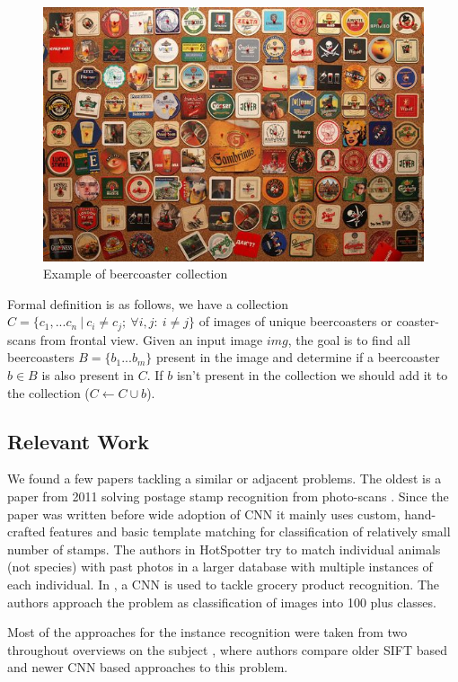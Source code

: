 \documentclass{article}
\begin{document}
\begin{figure}[H]
    \center
    \includegraphics[scale=0.5]{img/coasters.jpg}
    \caption{Example of beercoaster collection \cite{coasterExample}}
\end{figure}

Formal definition is as follows, we have a collection $C=\{c_1,...c_n\ |\ c_i \neq c_j;\ \forall i,j:\ i \neq j\}$ of images of unique beercoasters or coaster-scans from frontal view.
Given an input image $img$, the goal is to find all beercoasters $B=\{b_1...b_m\}$ present in the image 
and determine if a beercoaster $b \in B$ is also present in $C$. 
If $b$ isn't present in the collection we should add it to the collection ($C \leftarrow C \cup b$).

\subsection{Relevant Work}
We found a few papers tackling a similar or adjacent problems.
The oldest is a paper from 2011 solving postage stamp recognition from photo-scans \cite{postage}.
Since the paper was written before wide adoption of CNN it mainly uses custom, hand-crafted features and basic template matching for classification of relatively small number of stamps.
The authors in HotSpotter \cite{HotSpotter} try to match individual animals (not species) with past photos in a larger database with multiple instances of each individual.
In \cite{grocery}, a CNN is used to tackle grocery product recognition. The authors approach the problem as classification of images into 100 plus classes.

Most of the approaches for the instance recognition were taken from two throughout overviews on the subject \cite{overview1} \cite{overview2},
where authors compare older SIFT based and newer CNN based approaches to this problem.
\end{document}
